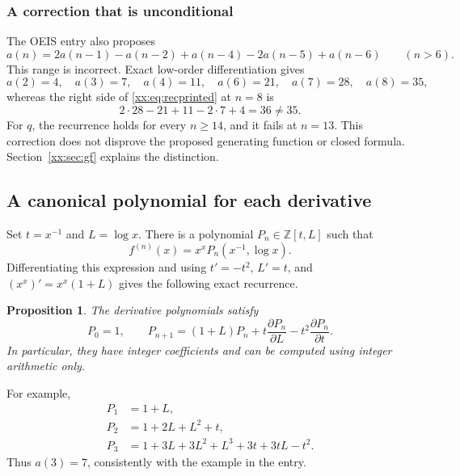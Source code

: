 \documentclass[11pt,a4paper]{article}
\numberwithin{equation}{section}
\newtheorem{proposition}[theorem]{Proposition}
\theoremstyle{definition}
\theoremstyle{remark}
\theoremstyle{plain}
\newcommand{\Z}{\mathbb Z}
\begin{document}
\subsubsection{A correction that is unconditional}
The OEIS entry also proposes
\begin{equation}\label{xx:eq:recprinted}
 a(n)=2a(n-1)-a(n-2)+a(n-4)-2a(n-5)+a(n-6)\qquad(n>6).
\end{equation}
This range is incorrect. Exact low-order differentiation gives
\[
 a(2)=4,\quad a(3)=7,\quad a(4)=11,\quad a(6)=21,\quad
 a(7)=28,\quad a(8)=35,
\]
whereas the right side of \eqref{xx:eq:recprinted} at $n=8$ is
\[
 2\cdot28-21+11-2\cdot7+4=36\ne35.
\]
For $q$, the recurrence holds for every $n\ge14$, and it fails at $n=13$.
This correction does not disprove the proposed generating function or
closed formula. Section~\ref{xx:sec:gf} explains the distinction.

\subsection{A canonical polynomial for each derivative}

Set $t=x^{-1}$ and $L=\log x$. There is a polynomial $P_n\in\Z[t,L]$ such that
\begin{equation}\label{xx:eq:Pdefinition}
 f^{(n)}(x)=x^x P_n(x^{-1},\log x).
\end{equation}
Differentiating this expression and using $t'=-t^2$, $L'=t$, and
$(x^x)'=x^x(1+L)$ gives the following exact recurrence.

\begin{proposition}\label{xx:prop:Prec}
The derivative polynomials satisfy
\begin{equation}\label{xx:eq:Prec}
 P_0=1,\qquad P_{n+1}=(1+L)P_n+t\frac{\partial P_n}{\partial L}
                         -t^2\frac{\partial P_n}{\partial t}.
\end{equation}
In particular, they have integer coefficients and can be computed using
integer arithmetic only.
\end{proposition}

For example,
\begin{align*}
 P_1&=1+L,\\
 P_2&=1+2L+L^2+t,\\
 P_3&=1+3L+3L^2+L^3+3t+3tL-t^2.
\end{align*}
Thus $a(3)=7$, consistently with the example in the entry.
\end{document}
